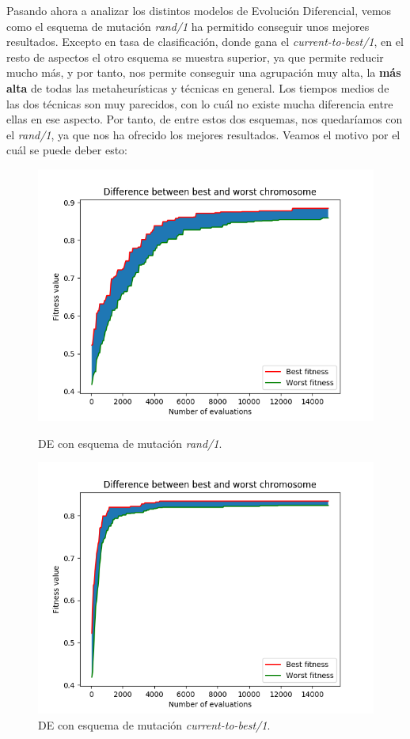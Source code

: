 \documentclass[11pt,a4paper]{article}
\begin{document}
Pasando ahora a analizar los distintos modelos de Evolución Diferencial, vemos como el esquema de mutación \textit{rand/1} ha
permitido conseguir unos mejores resultados. Excepto en tasa de clasificación, donde gana el \textit{current-to-best/1}, en
el resto de aspectos el otro esquema se muestra superior, ya que permite reducir mucho más, y por tanto, nos permite conseguir
una agrupación muy alta, la \textbf{más alta} de todas las metaheurísticas y técnicas en general. Los tiempos medios de las
dos técnicas son muy parecidos, con lo cuál no existe mucha diferencia entre ellas en ese aspecto. Por tanto, de entre estos
dos esquemas, nos quedaríamos con el \textit{rand/1}, ya que nos ha ofrecido los mejores resultados. Veamos el motivo por el
cuál se puede deber esto:

\begin{figure}[H]
\centering
\begin{minipage}{.5\textwidth}
	\centering
	\includegraphics[scale=0.4]{img/colposcopy-de-rand.png}
	\caption{DE con esquema de mutación \textit{rand/1}.}
\end{minipage}%
\begin{minipage}{.5\textwidth}
	\centering
	\includegraphics[scale=0.4]{img/colposcopy-de-best.png}
	\caption{DE con esquema de mutación \textit{current-to-best/1}.}
\end{minipage}
\end{figure}
\end{document}

